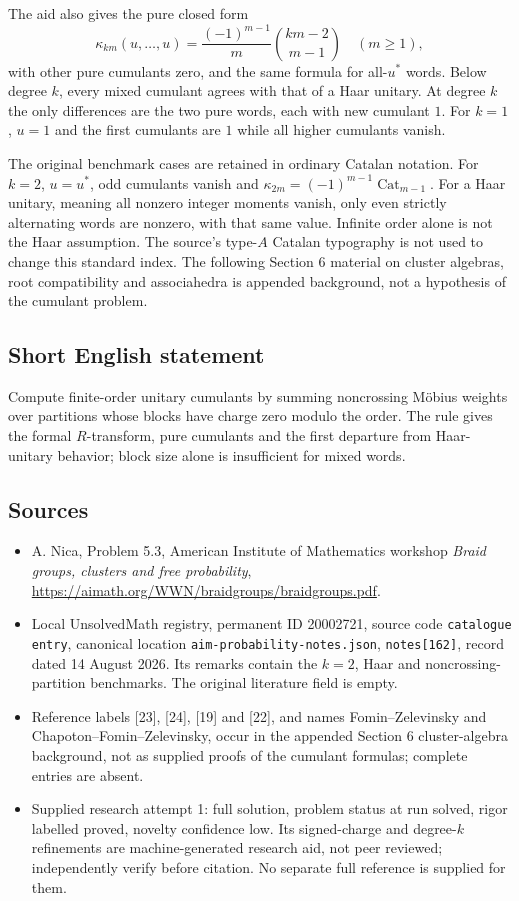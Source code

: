 \documentclass[11pt]{article}
\begin{document}
The aid also gives the pure closed form
\[
 \kappa_{km}(u,\ldots,u)
   =\frac{(-1)^{m-1}}m\binom{km-2}{m-1}\quad(m\ge1),
\]
with other pure cumulants zero, and the same formula for all-$u^*$ words. Below degree $k$, every mixed cumulant agrees with that of a Haar unitary. At degree $k$ the only differences are the two pure words, each with new cumulant $1$. For $k=1$, $u=1$ and the first cumulants are $1$ while all higher cumulants vanish.

The original benchmark cases are retained in ordinary Catalan notation. For $k=2$, $u=u^*$, odd cumulants vanish and $\kappa_{2m}=(-1)^{m-1}\operatorname{Cat}_{m-1}$. For a Haar unitary, meaning all nonzero integer moments vanish, only even strictly alternating words are nonzero, with that same value. Infinite order alone is not the Haar assumption. The source's type-$A$ Catalan typography is not used to change this standard index. The following Section 6 material on cluster algebras, root compatibility and associahedra is appended background, not a hypothesis of the cumulant problem.
\subsection{Short English statement}
Compute finite-order unitary cumulants by summing noncrossing M\"obius weights over partitions whose blocks have charge zero modulo the order. The rule gives the formal $R$-transform, pure cumulants and the first departure from Haar-unitary behavior; block size alone is insufficient for mixed words.
\subsection{Sources}
\begin{itemize}
\item A. Nica, Problem 5.3, American Institute of Mathematics workshop \emph{Braid groups, clusters and free probability}, \url{https://aimath.org/WWN/braidgroups/braidgroups.pdf}.
\item Local UnsolvedMath registry, permanent ID 20002721, source code \texttt{catalogue entry}, canonical location \texttt{aim-probability-notes.json}, \texttt{notes[162]}, record dated 14 August 2026. Its remarks contain the $k=2$, Haar and noncrossing-partition benchmarks. The original literature field is empty.
\item Reference labels [23], [24], [19] and [22], and names Fomin--Zelevinsky and Chapoton--Fomin--Zelevinsky, occur in the appended Section 6 cluster-algebra background, not as supplied proofs of the cumulant formulas; complete entries are absent.
\item Supplied research attempt 1: full solution, problem status at run solved, rigor labelled proved, novelty confidence low. Its signed-charge and degree-$k$ refinements are machine-generated research aid, not peer reviewed; independently verify before citation. No separate full reference is supplied for them.
\end{itemize}
\end{document}
